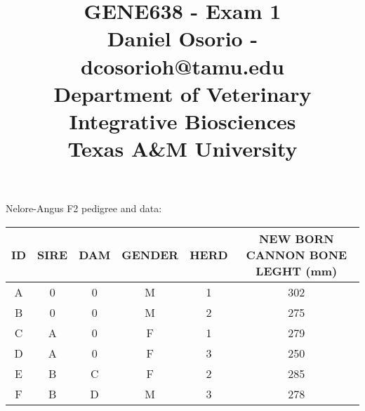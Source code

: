 \documentclass[12pt,a4paper]{paper}
\begin{document}
\title{GENE638 - Exam 1\\\small{Daniel Osorio - dcosorioh@tamu.edu\\Department of Veterinary Integrative Biosciences\\Texas A\&M University}}
\maketitle

Nelore-Angus F2 pedigree and data:
\begin{center}
\begin{tabular}{|c|c|c|c|c|c|}
\hline
ID&SIRE&DAM&GENDER&HERD&NEW BORN CANNON BONE LEGHT (mm)\\
\hline
\hline
A&0&0&M&1&302\\
\hline
B&0&0&M&2&275\\
\hline
C&A&0&F&1&279\\
\hline
D&A&0&F&3&250\\
\hline
E&B&C&F&2&285\\
\hline
F&B&D&M&3&278\\
\hline
\end{tabular}
\end{center}
\end{document}
